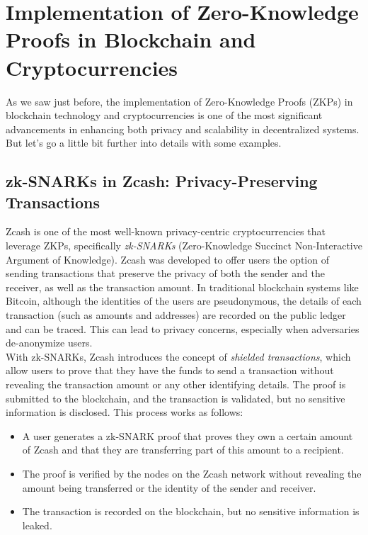\section{Implementation of Zero-Knowledge Proofs in Blockchain and Cryptocurrencies}
\justify
As we saw just before, the implementation of Zero-Knowledge Proofs (ZKPs) in blockchain technology and cryptocurrencies is one of the most significant advancements in enhancing both privacy and scalability in decentralized systems. But let's go a little bit further into details with some examples.

\subsection{zk-SNARKs in Zcash: Privacy-Preserving Transactions}
\justify
Zcash \cite{ZcashDocs} is one of the most well-known privacy-centric cryptocurrencies that leverage ZKPs, specifically \textit{zk-SNARKs} (Zero-Knowledge Succinct Non-Interactive Argument of Knowledge). Zcash was developed to offer users the option of sending transactions that preserve the privacy of both the sender and the receiver, as well as the transaction amount. \cite{sasson2014zcash} In traditional blockchain systems like Bitcoin, although the identities of the users are pseudonymous, the details of each transaction (such as amounts and addresses) are recorded on the public ledger and can be traced. This can lead to privacy concerns, especially when adversaries de-anonymize users.
\\
With zk-SNARKs, Zcash introduces the concept of \textit{shielded transactions}, which allow users to prove that they have the funds to send a transaction without revealing the transaction amount or any other identifying details. The proof is submitted to the blockchain, and the transaction is validated, but no sensitive information is disclosed. This process works as follows:
\begin{itemize}
    \item A user generates a zk-SNARK proof that proves they own a certain amount of Zcash and that they are transferring part of this amount to a recipient.
    \item The proof is verified by the nodes on the Zcash network without revealing the amount being transferred or the identity of the sender and receiver.
    \item The transaction is recorded on the blockchain, but no sensitive information is leaked.
\end{itemize}

